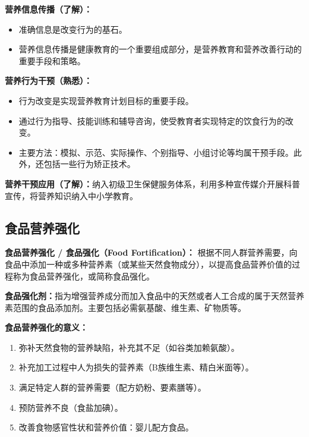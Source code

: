 \begin{tipbox}
\textbf{营养信息传播（了解）：}
\begin{itemize}[leftmargin=*]
    \item 准确信息是改变行为的基石。
    \item 营养信息传播是健康教育的一个重要组成部分，是营养教育和营养改善行动的重要手段和策略。
\end{itemize}

\textbf{营养行为干预（熟悉）：}
\begin{itemize}[leftmargin=*]
    \item 行为改变是实现营养教育计划目标的重要手段。
    \item 通过行为指导、技能训练和辅导咨询，使受教育者实现特定的饮食行为的改变。
    \item 主要方法：模拟、示范、实际操作、个别指导、小组讨论等均属干预手段。此外，还包括一些行为矫正技术。
\end{itemize}
\textbf{营养干预应用（了解）：}纳入初级卫生保健服务体系，利用多种宣传媒介开展科普宣传，将营养知识纳入中小学教育。
\end{tipbox}

\subsection{食品营养强化}

\begin{defbox}
\textbf{食品营养强化 / 食品强化（Food Fortification）：}
根据不同人群营养需要，向食品中添加一种或多种营养素（或某些天然食物成分），以提高食品营养价值的过程称为食品营养强化，或简称食品强化。

\textbf{食品强化剂：}指为增强营养成分而加入食品中的天然或者人工合成的属于天然营养素范围的食品添加剂。主要包括必需氨基酸、维生素、矿物质等。

\textbf{食品营养强化的意义：}
\begin{enumerate}[leftmargin=*]
    \item 弥补天然食物的营养缺陷，补充其不足（如谷类加赖氨酸）。
    \item 补充加工过程中人为损失的营养素（B族维生素、精白米面等）。
    \item 满足特定人群的营养需要（配方奶粉、要素膳等）。
    \item 预防营养不良（食盐加碘）。
    \item 改善食物感官性状和营养价值：婴儿配方食品。
\end{enumerate}
\end{defbox}

